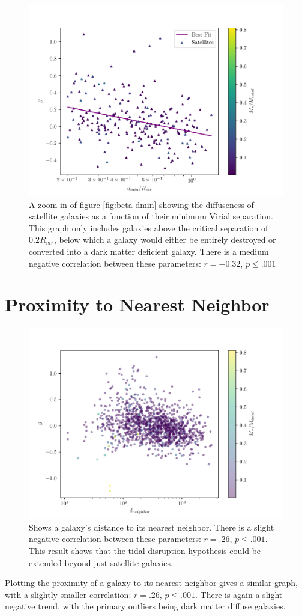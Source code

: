 \begin{figure}
    \centering
    \includegraphics*[width=\textwidth*2/3]{figs/me/beta-dmin-fit.pdf}
    \caption{A zoom-in of figure \ref{fig:beta-dmin} showing the diffuseness of satellite galaxies as a function of their minimum Virial separation. This graph only includes galaxies above the critical separation of $0.2 R_{vir}$, below which a galaxy would either be entirely destroyed or converted into a dark matter deficient galaxy. There is a medium negative correlation between these parameters: $r=-0.32$, $p \leq .001$}
    \label{fig:beta-dmin-fit}
\end{figure}


\section{Proximity to Nearest Neighbor}

\begin{figure}
    \centering
    \includegraphics*[width=\textwidth*2/3]{figs/me/beta-d_nearest.pdf}
    \caption{Shows a galaxy's distance to its nearest neighbor. There is a slight negative correlation between these parameters: $r = .26$, $p \leq .001$. This result shows that the tidal disruption hypothesis could be extended beyond just satellite galaxies.}

\end{figure}

Plotting the proximity of a galaxy to its nearest neighbor gives a similar graph, with a slightly smaller correlation: $r = .26$, $p \leq .001$. There is again a slight negative trend, with the primary outliers being dark matter diffuse galaxies. 